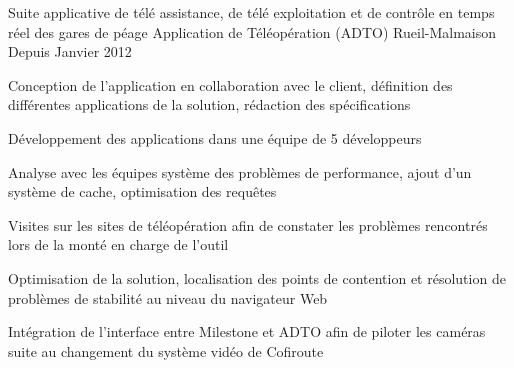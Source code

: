 
\begin{cventries}

  \cventry
    {Suite applicative de télé assistance, de télé exploitation et de contrôle en temps réel des gares de péage} %
    {Application de Téléopération (ADTO)} %
    {Rueil-Malmaison} %
    {Depuis Janvier 2012} %
    {
      \begin{cvitems} %
        \item {Conception de l'application en collaboration avec le client, définition des différentes applications de la solution, rédaction des spécifications}
        \item {Développement des applications dans une équipe de 5 développeurs}
        \item {Analyse avec les équipes système des problèmes de performance, ajout d'un système de cache, optimisation des requêtes}
        \item {Visites sur les sites de téléopération afin de constater les problèmes rencontrés lors de la monté en charge de l'outil}
        \item {Optimisation de la solution, localisation des points de contention et résolution de problèmes de stabilité au niveau du navigateur Web}
        \item {Intégration de l'interface entre Milestone et ADTO afin de piloter les caméras suite au changement du système vidéo de Cofiroute}
      \end{cvitems}
    } 


\end{cventries}
